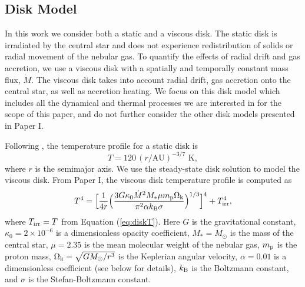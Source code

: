 \documentclass[apj]{emulateapj}
\begin{document}
\subsection{Disk Model}
\label{sec:disktime}

In this work we consider both a static and a viscous disk. The static disk is irradiated by the central star and does not experience redistribution of solids or radial movement of the nebular gas. To quantify the effects of radial drift and gas accretion, we use a viscous disk with a spatially and temporally constant mass flux, $\dot{M}$. The viscous disk takes into account radial drift, gas accretion onto the central star, as well as accretion heating. We focus on this disk model which includes all the dynamical and thermal processes we are interested in for the scope of this paper, and do not further consider the other disk models presented in Paper I.  

Following \citet{chiang10}, the temperature profile for a static disk is
\begin{equation}
\label{eq:diskT}
T = 120\, (r/\text{AU})^{-3/7} \,\,\text{K},
\end{equation}
where $r$ is the semimajor axis. We use the \citet{shakura73}  steady-state disk solution to model the viscous disk. From Paper I, the viscous disk temperature profile is computed as %
\begin{equation}
\label{eq:activeT}
T^4 =\Big[\frac{1}{4 r} \Big(\frac{3 G \kappa_0\dot{M}^2 M_* \mu m_{\rm p} \Omega_{\rm k}}{\pi^2 \alpha k_{\rm B} \sigma}\Big)^{1/3}\Big]^4 + T_{\rm irr}^4,
\end{equation}
where $T_{\rm irr}=T$ from Equation (\ref{eq:diskT}). Here $G$ is the gravitational constant, $\kappa_0=2 \times 10^{-6}$ is a dimensionless opacity coefficient, $M_*=M_{\odot}$ is the mass of the central star, $\mu=2.35$ is the mean molecular weight of the nebular gas, $m_{\rm p}$ is the proton mass, $\Omega_{\rm k}=\sqrt{G M_{\odot}/r^3}$ is the Keplerian angular velocity, $\alpha=0.01$ is a dimensionless coefficient (see below for details), $k_{\rm B}$ is the Boltzmann constant, and $\sigma$ is the Stefan-Boltzmann constant. 
\end{document}
